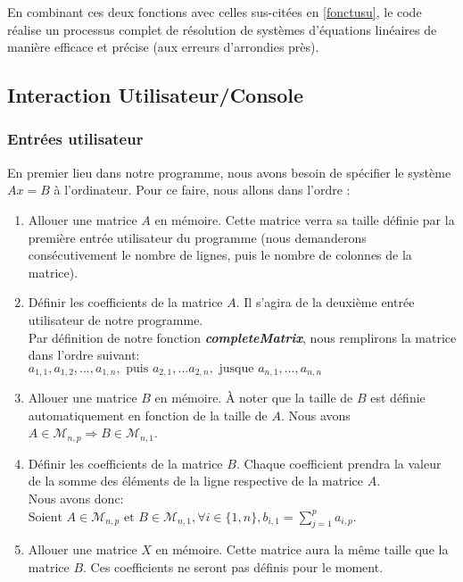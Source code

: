 En combinant ces deux fonctions avec celles sus-citées en \ref{fonctusu}, le code réalise un processus complet de résolution de systèmes d'équations linéaires de manière efficace et précise (aux erreurs d'arrondies près).\\
\subsection{Interaction Utilisateur/Console}
\subsubsection{Entrées utilisateur}

En premier lieu dans notre programme, nous avons besoin de spécifier le système $Ax=B$ à l'ordinateur. 
Pour ce faire, nous allons dans l'ordre :
\begin{enumerate}
\item Allouer une matrice $A$ en mémoire. Cette matrice verra sa taille définie par la première entrée utilisateur du programme (nous demanderons consécutivement le nombre de lignes, puis le nombre de colonnes de la matrice).
\item Définir les coefficients de la matrice $A$. Il s'agira de la deuxième entrée utilisateur de notre programme. \\
Par définition de notre fonction \textit{\textbf{completeMatrix}}, nous remplirons la matrice dans l'ordre suivant:\\
$a_{1,1}, a_{1,2}, ..., a_{1,n}, \text{   puis   } a_{2,1}, ... a_{2,n}, \text{   jusque   }  a_{n,1}, ..., a_{n,n}$
\item Allouer une matrice $B$ en mémoire. À noter que la taille de $B$ est définie automatiquement en fonction de la taille de $A$. Nous avons $A\in \mathcal{M}_{n,p} \Rightarrow B\in \mathcal{M}_{n,1}$.
\item Définir les coefficients de la matrice $B$. Chaque coefficient prendra la valeur de la somme des éléments de la ligne respective de la matrice $A$.\\
Nous avons donc:\\ $ \text{Soient } A\in \mathcal{M}_{n,p} \text{ et } B\in \mathcal{M}_{n,1}  , \forall i \in \{1,n\}  , b_{i,1}=\sum_{j=1}^{p} a_{i,p}$.\\
\item Allouer une matrice $X$ en mémoire. Cette matrice aura la même taille que la matrice $B$. Ces coefficients ne seront pas définis pour le moment.
\end{enumerate}

